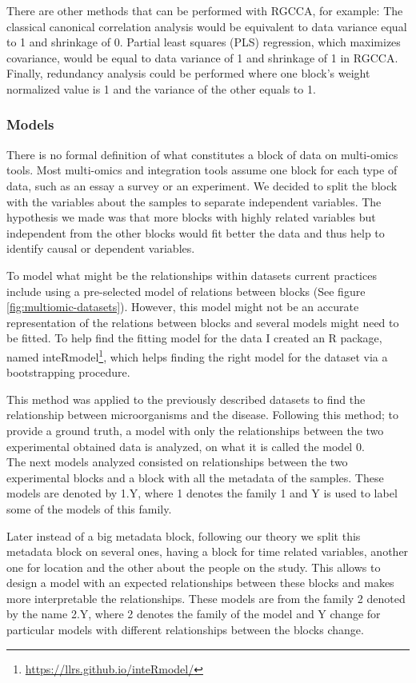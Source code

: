 \documentclass[
  12pt,
  a4paper,
  twoside,
  openright]{book}
\DeclareRobustCommand{\href}[2]{#2\footnote{\url{#1}}}
\begin{document}
There are other methods that can be performed with RGCCA, for example: The classical canonical correlation analysis would be equivalent to data variance equal to 1 and shrinkage of 0.
Partial least squares (PLS) regression, which maximizes covariance, would be equal to data variance of 1 and shrinkage of 1 in RGCCA.
Finally, redundancy analysis could be performed where one block's weight normalized value is 1 and the variance of the other equals to 1.

\hypertarget{models}{%
\subsubsection{Models}\label{models}}

There is no formal definition of what constitutes a block of data on multi-omics tools.
Most multi-omics and integration tools assume one block for each type of data, such as an essay a survey or an experiment.
We decided to split the block with the variables about the samples to separate independent variables.
The hypothesis we made was that more blocks with highly related variables but independent from the other blocks would fit better the data and thus help to identify causal or dependent variables.

To model what might be the relationships within datasets current practices include using a pre-selected model of relations between blocks (See figure \ref{fig:multiomic-datasets}).
However, this model might not be an accurate representation of the relations between blocks and several models might need to be fitted.
To help find the fitting model for the data I created an R package, named \href{https://llrs.github.io/inteRmodel/}{inteRmodel}, which helps finding the right model for the dataset via a bootstrapping procedure.

This method was applied to the previously described datasets to find the relationship between microorganisms and the disease.
Following this method; to provide a ground truth, a model with only the relationships between the two experimental obtained data is analyzed, on what it is called the model 0.\\
The next models analyzed consisted on relationships between the two experimental blocks and a block with all the metadata of the samples.
These models are denoted by 1.Y, where 1 denotes the family 1 and Y is used to label some of the models of this family.

Later instead of a big metadata block, following our theory we split this metadata block on several ones, having a block for time related variables, another one for location and the other about the people on the study.
This allows to design a model with an expected relationships between these blocks and makes more interpretable the relationships.
These models are from the family 2 denoted by the name 2.Y, where 2 denotes the family of the model and Y change for particular models with different relationships between the blocks change.
\end{document}
